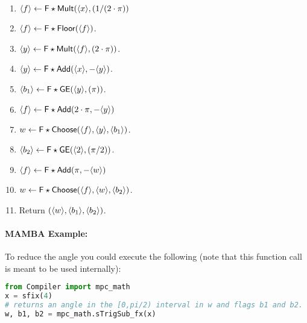 \begin{enumerate}

\item $\langle f \rangle \leftarrow \mathsf{F\star Mult}(\langle x \rangle,(1 /(2 \cdot \pi))$
\item $\langle f \rangle \leftarrow \mathsf{F\star Floor}(\langle f \rangle)$.
\item $\langle y \rangle \leftarrow \mathsf{F\star Mult}(\langle f \rangle,(2 \cdot \pi ))$.
\item $\langle y \rangle \leftarrow \mathsf{F\star Add}(\langle x \rangle,-\langle y \rangle)$.
\item $\langle b_1 \rangle \leftarrow \mathsf{F\star GE}(\langle y \rangle,(\pi))$.
\item $\langle f \rangle \leftarrow \mathsf{F\star Add}(2 \cdot \pi,-\langle y \rangle)$
\item $w \leftarrow \mathsf{F\star Choose}(\langle f \rangle,\langle y \rangle, \langle b_1 \rangle)$.
\item $\langle b_2 \rangle \leftarrow \mathsf{F\star GE}(\langle 2 \rangle,(\pi / 2))$.
\item $\langle f \rangle \leftarrow \mathsf{F\star Add}( \pi,-\langle w \rangle)$
\item $w \leftarrow \mathsf{F\star Choose}(\langle f \rangle,\langle w \rangle, \langle b_2 \rangle)$.
\item Return $(\langle w \rangle,\langle b_1 \rangle,\langle b_2 \rangle)$.

\end{enumerate}

\paragraph{MAMBA Example:} To reduce the angle you could execute the following (note that this function call is meant to be used internally):
\begin{lstlisting}[language={python}]
from Compiler import mpc_math
x = sfix(4)
# returns an angle in the [0,pi/2) interval in w and flags b1 and b2. 
w, b1, b2 = mpc_math.sTrigSub_fx(x)
\end{lstlisting}

